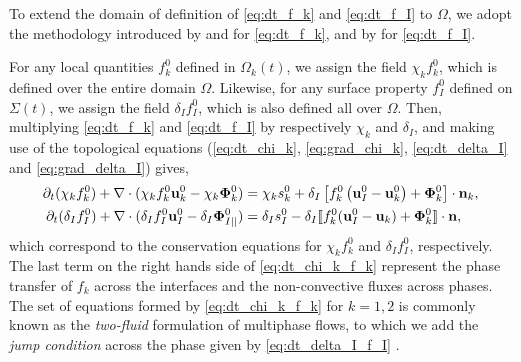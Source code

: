 To extend the domain of definition of \ref{eq:dt_f_k} and \ref{eq:dt_f_I} to $\Omega$, we adopt the methodology introduced by \citet{drew1983mathematical} and \citet{kataoka1986local} for \ref{eq:dt_f_k}, and by \citet[Appendix 2]{marle1982macroscopic} for \ref{eq:dt_f_I}.

For any local quantities $f_k^0$ defined in $\Omega_k(t)$, we assign the field $\chi_k f_k^0$, which is defined over the entire domain $\Omega$. 
Likewise, for any surface property $f_I^0$ defined on $\Sigma(t)$, we assign the field $\delta_I f_I^0$, which is also defined all over $\Omega$. 
Then, multiplying \ref{eq:dt_f_k} and \ref{eq:dt_f_I} by respectively $\chi_k$ and $\delta_I$, and making use of the topological equations (\ref{eq:dt_chi_k}, \ref{eq:grad_chi_k}, \ref{eq:dt_delta_I} and \ref{eq:grad_delta_I}) gives, 
\begin{align}
    \partial_t (\chi_k f_k^0)
    + \mathbf{\nabla}\cdot (
        \chi_k f_k^0 \textbf{u}_k^0
        - \chi_k \mathbf{\Phi}_k^0 
        )
    &= 
    \chi_k s_k^0
    + \delta_I\left[
        f_k^0
        \left(
            \textbf{u}_I^0
            - \textbf{u}_k^0
        \right)
        + \mathbf{\Phi}_k^0
    \right]
    \cdot \textbf{n}_k ,
    \label{eq:dt_chi_k_f_k}\\
    \partial_t (\delta_If_I^0)  
    + \mathbf{\nabla}\cdot (
        \delta_I f_I^0 \textbf{u}_I^0
        - \delta_I \mathbf{\Phi}_{I||}^0 
        )
    &= 
    \delta_Is_I^0
    - \delta_I \llbracket 
    f_k^0 (\textbf{u}_I^0 - \textbf{u}_k)
    + \mathbf{\Phi}_k^0
     \rrbracket \cdot \textbf{n},
    \label{eq:dt_delta_I_f_I}
\end{align}
which correspond to the conservation equations for $\chi_kf_k^0$ and $\delta_If_I^0$, respectively.
The last term on the right hands side of \ref{eq:dt_chi_k_f_k} represent the phase transfer of $f_k$ across the interfaces and the non-convective fluxes across phases.
The set of equations formed by \ref{eq:dt_chi_k_f_k} for $k =1,2$ is commonly known as the \textit{two-fluid} formulation of multiphase flows, to which we add the \textit{jump condition} across the phase given by \ref{eq:dt_delta_I_f_I} \citep{morel2015mathematical,tryggvason2011direct,drew1983mathematical,kataoka1986local}. 

